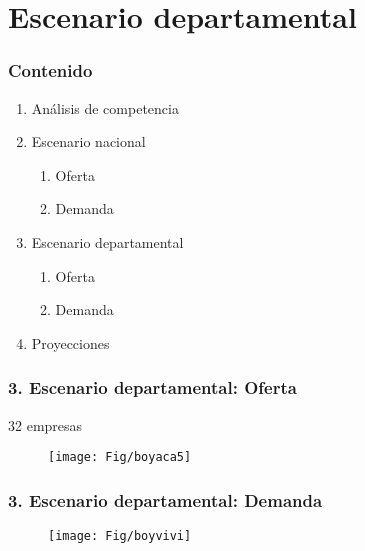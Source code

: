 \documentclass[10pt]{beamer}
\begin{document}
\section{Escenario departamental}
\begin{frame}
\frametitle{Contenido}
\begin{enumerate}[<i->]
\item Análisis de competencia 
\item  Escenario nacional
\begin{enumerate} [a]
\item Oferta
\item Demanda
\end{enumerate}
\item<1-> Escenario departamental
\begin{enumerate} [a]
\item<1-> Oferta
\item<1-> Demanda
\end{enumerate}
\item Proyecciones
\end{enumerate}
\end{frame}


\begin{frame}
\frametitle{3. Escenario departamental: Oferta}

\begin{flushleft}
{\tiny 32 empresas}
 \end{flushleft} 

\begin{figure}
\texttt{[image: Fig/boyaca5]}
\centering
  \label{fig:ejemplo}  
\end{figure}
\end{frame}


\begin{frame}
\frametitle{3. Escenario departamental: Demanda}

\begin{flushleft}
{\tiny }
 \end{flushleft} 

\begin{figure}
\texttt{[image: Fig/boyvivi]}
\centering
  \label{fig:ejemplo}  
\end{figure}
\end{frame}
\end{document}
